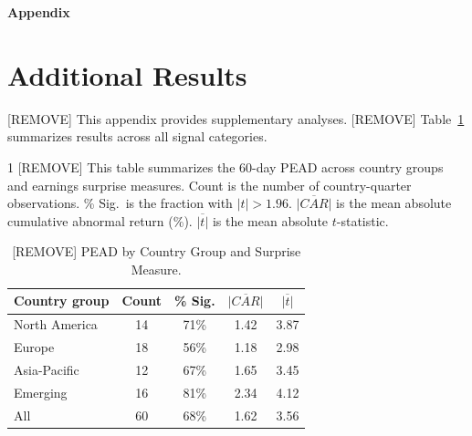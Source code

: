 \documentclass[12pt]{article}
\begin{document}
\clearpage



\clearpage
\newpage
\appendix

\begin{center}
 {\LARGE \textbf{Appendix}}
\end{center}

\renewcommand{\theequation}{A.\arabic{equation}}%
\renewcommand{\thefigure}{A.\arabic{figure}} \setcounter{figure}{0}
\renewcommand{\thetable}{A.\arabic{table}} \setcounter{table}{0}


\vspace{-.25cm}
\section{Additional Results} \label{app:a}

[REMOVE] This appendix provides supplementary analyses. [REMOVE] Table~\ref{tab:example_summary} summarizes results across all signal categories.

\begin{table}[!ht]
\caption{[REMOVE] PEAD by Country Group and Surprise Measure.}
\begin{spacing}{1}
{\footnotesize
[REMOVE] This table summarizes the 60-day PEAD across country groups and earnings surprise measures. Count is the number of country-quarter observations. \% Sig.\ is the fraction with $|t| > 1.96$. $\overline{|CAR|}$ is the mean absolute cumulative abnormal return (\%). $\overline{|t|}$ is the mean absolute $t$-statistic.}
\end{spacing}
\vspace{-4mm}
\begin{center}
\label{tab:example_summary}
\vspace{2mm}
\begin{tabular}{l cccc}
\toprule
Country group & Count & \% Sig. & $\overline{|CAR|}$ & $\overline{|t|}$ \\
\midrule
North America & 14 & 71\% & 1.42 & 3.87 \\
\addlinespace
Europe & 18 & 56\% & 1.18 & 2.98 \\
\addlinespace
Asia-Pacific & 12 & 67\% & 1.65 & 3.45 \\
\addlinespace
Emerging & 16 & 81\% & 2.34 & 4.12 \\
\midrule
All & 60 & 68\% & 1.62 & 3.56 \\
\bottomrule
\end{tabular}
\end{center}
\end{table}
\end{document}
